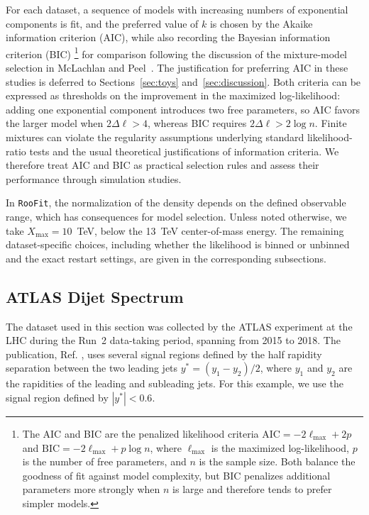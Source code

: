 \documentclass[a4paper,11pt]{article}
\begin{document}
For each dataset, a sequence of models with increasing numbers of exponential components is fit, and the preferred value of $k$ is chosen by the Akaike information criterion (AIC), while also recording the Bayesian information criterion (BIC)
\footnote{The AIC and BIC are the penalized likelihood criteria $\mathrm{AIC}=-2\ell_{\max}+2p$ 
and $\mathrm{BIC}=-2\ell_{\max}+p\log n$, where $\ell_{\max}$ is the maximized log-likelihood, $p$ is the number of free parameters, and $n$ is the sample size. Both balance the goodness of fit against model complexity, but BIC penalizes additional parameters more strongly when $n$ is 
large and therefore tends to prefer simpler models.
} for comparison following the discussion of the mixture-model 
selection in McLachlan and Peel~\cite{finite-mixture-models}. The justification for preferring AIC in these studies is deferred to Sections~\ref{sec:toys} and~\ref{sec:discussion}. Both criteria can be expressed as thresholds on the improvement in the maximized log-likelihood: adding one exponential component introduces two free parameters, so AIC favors the larger model when $2\Delta\ell>4$, whereas BIC requires $2\Delta\ell>2\log n$. Finite mixtures can violate the regularity assumptions underlying standard likelihood-ratio tests and the usual theoretical justifications of information criteria. We therefore treat AIC and BIC as practical selection rules and assess their performance through simulation studies.

In \texttt{RooFit}, the normalization of the density depends on the defined observable range, which has consequences for model selection. Unless noted otherwise, we take $X_{\max}=10$~TeV, below the 13~TeV center-of-mass energy. The remaining dataset-specific choices, including whether the likelihood is binned or unbinned and the exact restart settings, are given in the corresponding subsections.

\subsection{ATLAS Dijet Spectrum} \label{sec:example1}

The dataset used in this section was collected by the ATLAS experiment at the LHC during the 
Run~2 data-taking period, spanning from 2015 to 2018.
The publication, Ref. \cite{ATLAS_dijet}, uses several signal regions defined by the half rapidity separation between the two leading jets $y^*= (y_1 - y_2)/2$, where $y_1$ and $y_2$ are the rapidities of the leading and subleading jets. For this example, we use the signal region defined by $|y^*|<0.6$. 
\end{document}
